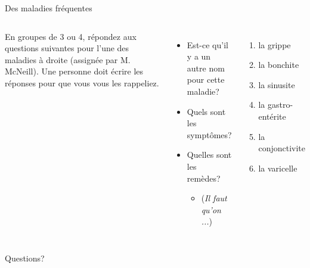 \documentclass{beamer}
\begin{document}
  \begin{frame}{Des maladies fréquentes}
    \begin{columns}
      \scriptsize
        En groupes de 3 ou 4, répondez aux questions suivantes pour l'une des maladies à droite (assignée par M. McNeill).
        Une personne doit écrire les réponses pour que vous vous les rappeliez.
        \begin{itemize}
          \item Est-ce qu'il y a un autre nom pour cette maladie?
          \item Quels sont les symptômes?
          \item Quelles sont les remèdes?
          \begin{itemize}
            \scriptsize
            \item (\emph{Il faut qu'on ...})
          \end{itemize}
        \end{itemize}
        \begin{enumerate}
          \item la grippe
          \item la bonchite
          \item la sinusite
          \item la gastro-entérite
          \item la conjonctivite
          \item la varicelle
        \end{enumerate}
    \end{columns}
  \end{frame}

  \begin{frame}{}
    \begin{center}
      \Large Questions?
    \end{center}
  \end{frame}
\end{document}
